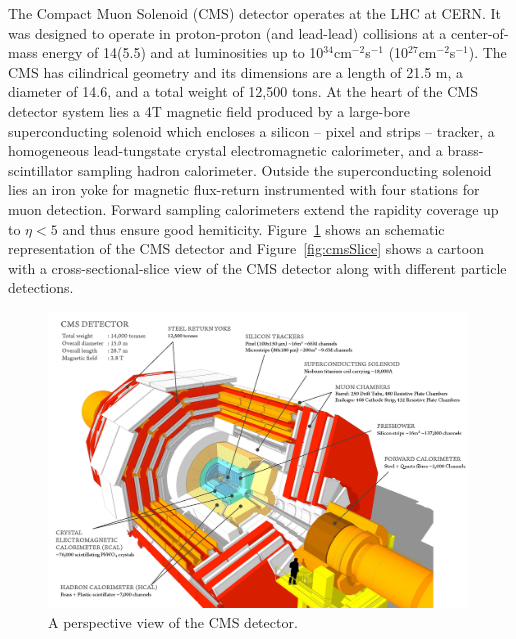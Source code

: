 The Compact Muon Solenoid (CMS) detector operates at the LHC at CERN. It was designed to operate in proton-proton (and lead-lead)
collisions at a center-of-mass energy of 14\TeV (5.5\TeV) and at
luminosities up to 10$^{34}$cm$^{-2}$s$^{-1}$
(10$^{27}$cm$^{-2}$s$^{-1}$). The CMS has cilindrical geometry and
its dimensions are a length of 21.5 m, a diameter of 14.6, and a total
weight of 12,500 tons. At the heart of the CMS detector system
lies a 4\unit{T} magnetic field produced by a large-bore superconducting
solenoid which encloses a silicon -- pixel and strips -- tracker, a homogeneous
lead-tungstate crystal electromagnetic calorimeter, and a brass-scintillator
sampling hadron calorimeter. Outside the superconducting solenoid lies
an iron yoke for magnetic flux-return instrumented with four stations
for muon detection. Forward sampling calorimeters extend the rapidity
coverage up to $\eta < 5$ and thus ensure good
hemiticity. Figure~\ref{fig:cmsDetector} shows an schematic representation
of the CMS detector and Figure~\ref{fig:cmsSlice} shows a cartoon
with a cross-sectional-slice view of the CMS detector along with
different particle detections.
\begin{figure}
 \centering
\includegraphics[width=0.99\textwidth]{CMS_DetectorFigures/cms_detector.png}
 \caption{A perspective view of the CMS detector.\label{fig:cmsDetector}}
\end{figure}
